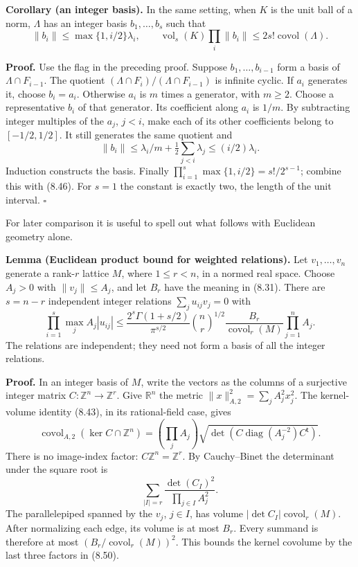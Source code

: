\documentclass[
  11pt,
  a4paper,
]{article}
\begin{document}
\textbf{Corollary (an integer basis).} In the same setting, when \(K\)
is the unit ball of a norm, \(\Lambda\) has an integer basis
\(b_1,\ldots,b_s\) such that \[
\|b_i\|\le\max\{1,i/2\}\lambda_i,\qquad
\operatorname{vol}_s(K)\prod_i\|b_i\|
\le2s!\operatorname{covol}(\Lambda).
\tag{8.49}
\]

\textbf{Proof.} Use the flag in the preceding proof. Suppose
\(b_1,\ldots,b_{i-1}\) form a basis of \(\Lambda\cap F_{i-1}\). The
quotient \((\Lambda\cap F_i)/(\Lambda\cap F_{i-1})\) is infinite cyclic.
If \(a_i\) generates it, choose \(b_i=a_i\). Otherwise \(a_i\) is \(m\)
times a generator, with \(m\ge2\). Choose a representative \(b_i\) of
that generator. Its coefficient along \(a_i\) is \(1/m\). By subtracting
integer multiples of the \(a_j\), \(j<i\), make each of its other
coefficients belong to \([-1/2,1/2]\). It still generates the same
quotient and \[
\|b_i\|\le\lambda_i/m+\tfrac12\sum_{j<i}\lambda_j
\le(i/2)\lambda_i.
\] Induction constructs the basis. Finally
\(\prod_{i=1}^s\max\{1,i/2\}=s!/2^{s-1}\); combine this with (8.46). For
\(s=1\) the constant is exactly two, the length of the unit interval.
\(\square\)

For later comparison it is useful to spell out what follows with
Euclidean geometry alone.

\textbf{Lemma (Euclidean product bound for weighted relations).} Let
\(v_1,\ldots,v_n\) generate a rank-\(r\) lattice \(M\), where
\(1\le r<n\), in a normed real space. Choose \(A_j>0\) with
\(\|v_j\|\le A_j\), and let \(B_r\) have the meaning in (8.31). There
are \(s=n-r\) independent integer relations \(\sum_j u_{ij}v_j=0\) with
\[
\prod_{i=1}^{s}\max_j A_j|u_{ij}|
\le
\frac{2^s\Gamma(1+s/2)}{\pi^{s/2}}
\binom nr^{1/2}
\frac{B_r}{\operatorname{covol}_r(M)}
\prod_{j=1}^n A_j.
\tag{8.50}
\] The relations are independent; they need not form a basis of all the
integer relations.

\textbf{Proof.} In an integer basis of \(M\), write the vectors as the
columns of a surjective integer matrix \(C:\mathbb Z^n\to\mathbb Z^r\).
Give \(\mathbb R^n\) the metric \(\|x\|_{A,2}^2=\sum_j A_j^2x_j^2\). The
kernel-volume identity (8.43), in its rational-field case, gives \[
\operatorname{covol}_{A,2}(\ker C\cap\mathbb Z^n)
=\left(\prod_j A_j\right)
\sqrt{\det(C\operatorname{diag}(A_j^{-2})C^{\mathsf t})}.
\] There is no image-index factor: \(C\mathbb Z^n=\mathbb Z^r\). By
Cauchy--Binet the determinant under the square root is \[
\sum_{|I|=r}\frac{\det(C_I)^2}{\prod_{j\in I}A_j^2}.
\] The parallelepiped spanned by the \(v_j\), \(j\in I\), has volume
\(|\det C_I|\operatorname{covol}_r(M)\). After normalizing each edge,
its volume is at most \(B_r\). Every summand is therefore at most
\((B_r/\operatorname{covol}_r(M))^2\). This bounds the kernel covolume
by the last three factors in (8.50).
\end{document}
